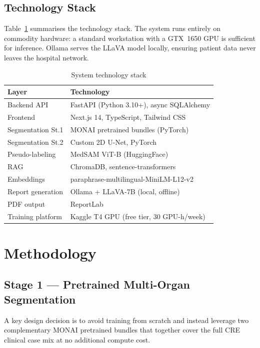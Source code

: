 \documentclass[conference]{IEEEtran}
\begin{document}
\subsection{Technology Stack}
Table~\ref{tab:stack} summarises the technology stack. The system runs entirely
on commodity hardware: a standard workstation with a GTX~1650 GPU is sufficient
for inference. Ollama serves the LLaVA model locally, ensuring patient data
never leaves the hospital network.

\begin{table}[h]
\caption{System technology stack}
\label{tab:stack}
\centering
\renewcommand{\arraystretch}{1.15}
\begin{tabular}{ll}
\toprule
\textbf{Layer} & \textbf{Technology} \\
\midrule
Backend API       & FastAPI (Python 3.10+), async SQLAlchemy \\
Frontend          & Next.js 14, TypeScript, Tailwind CSS \\
Segmentation St.1 & MONAI pretrained bundles (PyTorch) \\
Segmentation St.2 & Custom 2D U-Net, PyTorch \\
Pseudo-labeling   & MedSAM ViT-B (HuggingFace) \\
RAG               & ChromaDB, sentence-transformers \\
Embeddings        & paraphrase-multilingual-MiniLM-L12-v2 \\
Report generation & Ollama + LLaVA-7B (local, offline) \\
PDF output        & ReportLab \\
Training platform & Kaggle T4 GPU (free tier, 30 GPU-h/week) \\
\bottomrule
\end{tabular}
\end{table}

\section{Methodology}

\subsection{Stage 1 --- Pretrained Multi-Organ Segmentation}

A key design decision is to avoid training from scratch and instead leverage
two complementary MONAI pretrained bundles that together cover the full CRE
clinical case mix at no additional compute cost.
\end{document}
